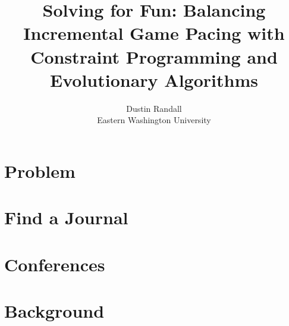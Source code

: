\documentclass[letterpaper,twocolumn,10pt]{article}
\begin{document}

\date{}

\title{\Large \bf Solving for Fun: Balancing Incremental Game Pacing with Constraint Programming and Evolutionary Algorithms}

\author{
{\rm Dustin Randall}\\
Eastern Washington University
} %

\maketitle

\section{Problem}


\section{Find a Journal}


\section{Conferences}


\section{Background}







\end{document}
